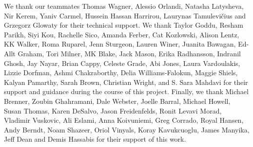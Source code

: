 We thank our teammates Thomas Wagner, Alessio Orlandi, Natasha Latysheva, Nir Kerem, Yaniv Carmel, Hussein Hassan Harrirou, Laurynas Tamulevičius and Grzegorz Glowaty for their technical support. We thank Taylor Goddu, Resham Parikh, Siyi Kou, Rachelle Sico, Amanda Ferber, Cat Kozlowski, Alison Lentz, KK Walker, Roma Ruparel, Jenn Sturgeon, Lauren Winer, Juanita Bawagan, Ed-Allt Graham, Tori Milner, MK Blake, Jack Mason, Erika Radhansson, Indranil Ghosh, Jay Nayar, Brian Cappy, Celeste Grade, Abi Jones, Laura Vardoulakis, Lizzie Dorfman, Ashmi Chakraborthy, Delia Williams-Falokun, Maggie Shiels, Kalyan Pamarthy, Sarah Brown,  Christian Wright, and S. Sara Mahdavi for their support and guidance during the course of this project. Finally, we thank Michael Brenner, Zoubin Ghahramani, Dale Webster, Joelle Barral, Michael Howell, Susan Thomas, Karen DeSalvo, Jason Freidenfelds, Ronit Levavi Morad, Vladimir Vuskovic, Ali Eslami, Anna Koivuniemi, Greg Corrado, Royal Hansen, Andy Berndt, Noam Shazeer, Oriol Vinyals, Koray Kavukcuoglu, James Manyika, Jeff Dean and Demis Hassabis for their support of this work.


\vspace{12pt}

\newpage
\setlength\bibitemsep{3pt}
\printbibliography
\balance
\clearpage
